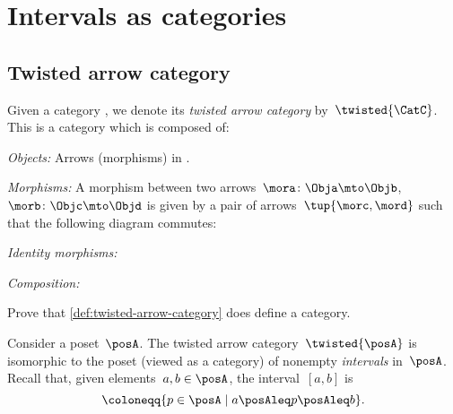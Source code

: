 \section{Intervals as categories}

\subsection{Twisted arrow category}



\begin{ctdefinition}\label{def:twisted-arrow-category}
  \label{def:twisted-arrow}
  Given a category \CatC, we denote its \emph{twisted arrow category} by~$\twisted{\CatC}$. This is a category which is composed of:
  \begin{compactenum}
    \item \emph{Objects:} Arrows (morphisms) in \CatC.
    \item \emph{Morphisms:} A morphism between two arrows~$\mora\colon \Obja \mto \Objb $,~$\morb\colon \Objc \mto \Objd$ is given by a pair of arrows~$\tup{\morc,\mord}$ such that the following diagram commutes:
    \begin{center}
    \end{center}
    \item \emph{Identity morphisms:}
    \item \emph{Composition:}
  \end{compactenum}
\end{ctdefinition}

\begin{gradedexercise}
Prove that \cref{def:twisted-arrow-category} does define a category.
\end{gradedexercise}


\begin{example}[Intervals]
  \label{exa:twisted-arrow-poset}
  Consider a poset~$\posA$.
  The twisted arrow category~$\twisted{\posA}$ is isomorphic to the poset (viewed as a category) of nonempty \emph{intervals} in~$\posA$.
  Recall that, given elements~$a, b \in \posA$, the interval~$[a,b]$ is
  \begin{equation*}
  [a,b]\coloneqq \{p \in \posA \mid a\posAleq p \posAleq b\}.
  \end{equation*}
\end{example}

